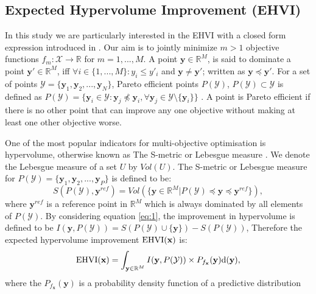 \subsection{Expected Hypervolume Improvement (EHVI)}
In this study we are particularly interested in the EHVI with a closed form expression
introduced in \cite{emmerich2008computation}.
Our aim is to jointly minimize $m>1$ objective functions $f_m: \mathcal{X} \rightarrow
\mathbb{R}$ for $m=1,...,M$.
A point $\textbf{y} \in \mathbb{R}^M$, is said to dominate  a point $\textbf{y}' \in
\mathbb{R}^M$, iff $\forall i \in \{{1,...,M}\}: y_i \leq y'_i $ and $\textbf{y} \neq \textbf{y}'$;
written as $\textbf{y} \preceq \textbf{y}'$. For a set of points $\mathcal{Y} = \{\textbf{y}_1,\textbf{y}_2,...,\textbf{y}_N\}$,
Pareto efficient points $P(\mathcal{Y})$, $P(\mathcal{Y}) \subset \mathcal{Y}$  is defined as $P(\mathcal{Y}) = \{\textbf{y}_i \in
\mathcal{Y}: \textbf{y}_j \npreceq \textbf{y}_i, \forall \textbf{y}_j \in \mathcal{Y} \setminus \{\textbf{y}_i\} \}$ \cite{shah2016pareto}. 
A point is Pareto efficient if there is no other point that can improve any one objective without making at least one other objective worse.
\par
One of the most popular indicators for multi-objective optimisation is hypervolume, otherwise known as The S-metric or Lebesgue measure \cite{laumanns2000unified}. We denote the Lebesgue measure of a set $U$ by $Vol(U)$. The S-metric or Lebesgue measure for $P(\mathcal{Y}) =
\{\textbf{y}_1,\textbf{y}_2,...,\textbf{y}_P\}$ is defined to be:
\begin{equation}
  S(P(\mathcal{Y}),\textbf{y}^{ref}) = Vol(\{\textbf{y} \in \mathbb{R}^M| P(\mathcal{Y}) \preceq \textbf{y}
  \preceq \textbf{y}^{ref}\}),
\label{eq:1}
\end{equation}
where $\textbf{y}^{ref}$  is a reference point in $\mathbb{R}^M$ which is always dominated
by all elements of $P(\mathcal{Y})$. By considering equation \ref{eq:1}, the improvement in hypervolume
is defined to be $I(\textbf{y},P(\mathcal{Y})) = S(P(\mathcal{Y}) \cup \{\textbf{y}\}) - S(P(\mathcal{Y}))$,
 Therefore the expected hypervolume improvement ${\rm EHVI}(\textbf{x})$ is:
\begin{equation}
  {\rm EHVI}(\textbf{x}) = \int_{\textbf{y} \in \mathbb{R}^M} I(\textbf{y},P(\mathcal{Y}))\\
  \times {P}_{{f}_{\textbf{x}}}(\textbf{y}) \mathrm{d}(\textbf{y}),
\label{eq:2}
\end{equation}
where the ${P}_{{f}_{\textbf{x}}}(\textbf{y})$ is a probability density function of a predictive distribution
